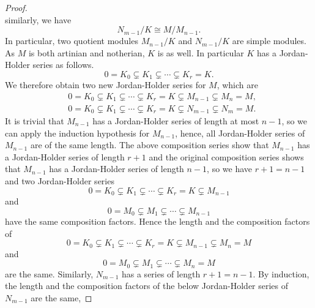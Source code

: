 \documentclass[12pt,a4paper]{report}
\theoremstyle{definition}
\theoremstyle{remark}
\theoremstyle{definition}
\begin{document}
\begin{proof}
\begin{equation*}
\end{equation*}
similarly, we have
\begin{equation*}
N_{m-1} / K \cong M / M_{n-1}.
\end{equation*}
In particular, two quotient modules $M_{n-1} / K$ and $N_{m-1} / K$ are simple modules. As $M$ is both artinian and notherian, $K$ is as well. In particular $K$ has a Jordan-Holder series as follows.
\begin{equation*}
0=K_{0} \subsetneq K_{1} \subsetneq \cdots \subsetneq K_{r}=K.
\end{equation*}
We therefore obtain two new Jordan-Holder series for $M$, which are
\begin{equation*}
\begin{aligned}
& 0=K_{0} \subsetneq K_{1} \subsetneq \cdots \subsetneq K_{r}=K \subsetneq M_{n-1} \subsetneq M_{n}=M, \\
& 0=K_{0} \subsetneq K_{1} \subsetneq \cdots \subsetneq K_{r}=K \subsetneq N_{m-1} \subsetneq N_{m}=M.
\end{aligned}
\end{equation*}
It is trivial that $M_{n-1}$ has a Jordan-Holder series of length at most $ n-1$, so we can apply the induction hypothesis for $M_{n-1}$, hence, all Jordan-Holder series of $M_{n-1}$ are of the same length. The above composition series show that $M_{n-1}$ has a Jordan-Holder series of length $r+1$ and the original composition series shows that $M_{n-1}$ has a Jordan-Holder series of length $n-1$, so we have $r+1=n-1$ and two Jordan-Holder series
\begin{equation*}
0=K_{0} \subsetneq K_{1} \subsetneq \cdots \subsetneq K_{r}=K \subsetneq M_{n-1}
\end{equation*}
and
\begin{equation*}
0=M_{0} \subsetneq M_{1} \subsetneq \cdots \subsetneq M_{n-1}
\end{equation*}
have the same composition factors. Hence the length and the composition factors of 
\begin{equation*}
     0=K_{0} \subsetneq K_{1} \subsetneq \cdots \subsetneq K_{r}=K \subsetneq M_{n-1} \subsetneq M_{n}=M
\end{equation*}
and
\begin{equation*}
     0 = M_0 \subsetneq M_1\subsetneq \cdots \subsetneq M_n = M
\end{equation*}
are the same. Similarly, $N_{m-1}$ has a series of length $r+1=n-1$. By induction, the length and the composition factors of the below Jordan-Holder series of $N_{m-1}$ are the same,

\end{proof}
\end{document}
